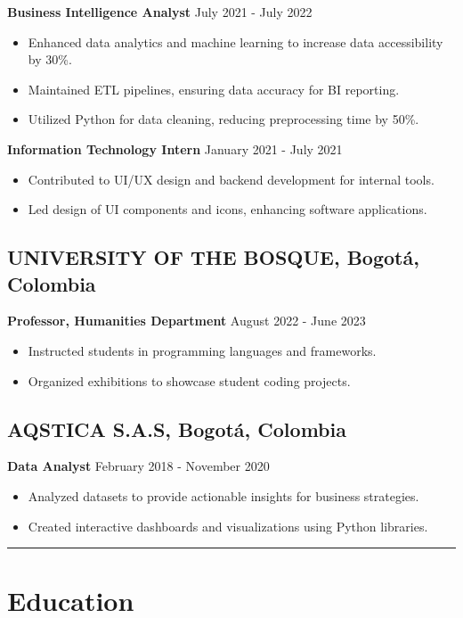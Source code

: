 \documentclass[11pt,a4paper]{article}
\begin{document}
\textbf{Business Intelligence Analyst} \hfill July 2021 - July 2022
\begin{itemize}[noitemsep]
    \item Enhanced data analytics and machine learning to increase data accessibility by 30\%.
    \item Maintained ETL pipelines, ensuring data accuracy for BI reporting.
    \item Utilized Python for data cleaning, reducing preprocessing time by 50\%.
\end{itemize}

\textbf{Information Technology Intern} \hfill January 2021 - July 2021
\begin{itemize}[noitemsep]
    \item Contributed to UI/UX design and backend development for internal tools.
    \item Led design of UI components and icons, enhancing software applications.
\end{itemize}

\subsection*{UNIVERSITY OF THE BOSQUE, Bogotá, Colombia}
\textbf{Professor, Humanities Department} \hfill August 2022 - June 2023
\begin{itemize}[noitemsep]
    \item Instructed students in programming languages and frameworks.
    \item Organized exhibitions to showcase student coding projects.
\end{itemize}

\subsection*{AQSTICA S.A.S, Bogotá, Colombia}
\textbf{Data Analyst} \hfill February 2018 - November 2020
\begin{itemize}[noitemsep]
    \item Analyzed datasets to provide actionable insights for business strategies.
    \item Created interactive dashboards and visualizations using Python libraries.
\end{itemize}
\rule{\textwidth}{0.4pt} 
\section*{Education}
\end{document}
